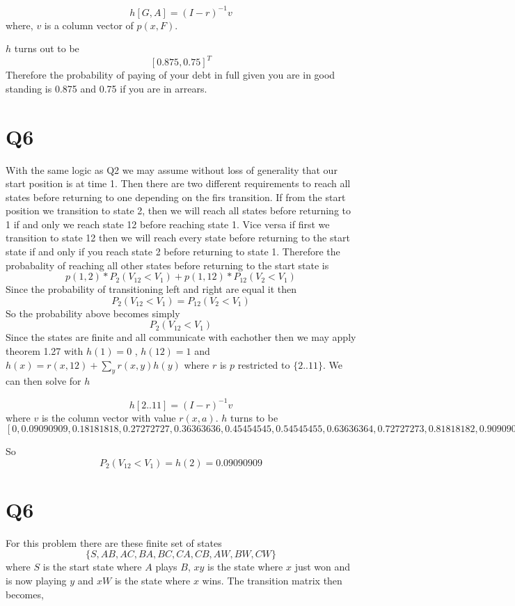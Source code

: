 \documentclass{article}
\begin{document}
\[
h[G,A] = (I - r)^{-1}v
\]
where, $v$ is a column vector of $p(x,F)$.

$h$ turns out to be
\[
[ 0.875,  0.75 ]^T
\]
Therefore the probability of paying of your debt in full given you are in good standing is 0.875 and 0.75 if you are in arrears. 

\section*{Q6}
With the same logic as Q2 we may assume without loss of generality that our start position is at time 1. Then there are two different requirements to reach all states before returning to one depending on the firs transition. If from the start position we transition to state 2, then we will reach all states before returning to 1 if and only we reach state 12 before reaching state 1. Vice versa if first we transition to state 12 then we will reach every state before returning to the start state if and only if you reach state 2 before returning to state 1. 
Therefore the probabality of reaching all other states before returning to the start state is
\[
p(1,2)*P_2(V_12 < V_1) + p(1,12)*P_12(V_2 < V_1)
\]
Since the probability of transitioning left and right are equal it then 
\[
P_2(V_{12} < V_1) = P_12(V_2 < V_1)
\]
So the probability above becomes simply
\[
P_2(V_{12} < V_1)
\]
Since the states are finite and all communicate with eachother then we may apply theorem 1.27 with $h(1) = 0$ , $h(12) = 1$ and $h(x) = r(x,12) + \sum_y r(x,y)h(y)$ where $r$ is $p$ restricted to $\{2..11\}$. 
We can then solve for $h$

\[
h[2 .. 11] = (I -r)^{-1} v
\]
where $v$ is the column vector with value $r(x,a)$.
$h$ turns to be 
\[
[0, 0.09090909,  0.18181818,  0.27272727,  0.36363636,  0.45454545,
        0.54545455,  0.63636364,  0.72727273,  0.81818182,  0.90909091,1]
\]

So
\[
P_2(V_{12} < V_1) = h(2) = 0.09090909
\]

\section*{Q6}
For this problem there are these finite set of states
\[
\{S, AB, AC, BA, BC, CA, CB, AW, BW, CW\}
\]
where $S$ is the start state where $A$ plays $B$, $xy$ is the state where $x$ just won and is now playing $y$ and $xW$ is the state where $x$ wins. 
The transition matrix then becomes,
\end{document}
